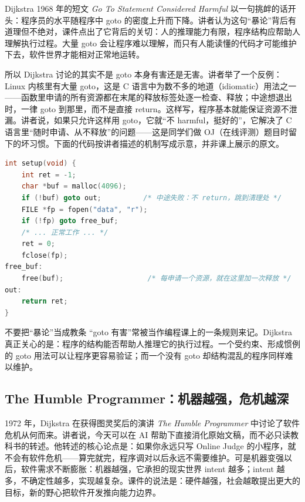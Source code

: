 \documentclass[a4paper]{article}
\begin{document}
Dijkstra 1968 年的短文 \emph{Go To Statement Considered Harmful} 以一句挑衅的话开头：程序员的水平随程序中 goto 的密度上升而下降。讲者认为这句“暴论”背后有道理但不绝对，课件点出了它背后的关切：人的推理能力有限，程序结构应帮助人理解执行过程。大量 goto 会让程序难以理解，而只有人能读懂的代码才可能维护下去，软件世界才能相对正常地运转。

所以 Dijkstra 讨论的其实不是 goto 本身有害还是无害。讲者举了一个反例：Linux 内核里有大量 goto，这是 C 语言中为数不多的地道（idiomatic）用法之一——函数里申请的所有资源都在末尾的释放标签处逐一检查、释放；中途想退出时，一律 goto 到那里，而不是直接 return。这样写，程序基本就能保证资源不泄漏。讲者说，如果只允许这样用 goto，它就“不 harmful，挺好的”，它解决了 C 语言里“随时申请、从不释放”的问题——这是同学们做 OJ（在线评测）题目时留下的坏习惯。下面的代码按讲者描述的机制写成示意，并非课上展示的原文。

\begin{lstlisting}[language=C,caption={讲者描述的 C 语言 goto 清理惯用法（本讲义按描述整理的示意）}]
int setup(void) {
    int ret = -1;
    char *buf = malloc(4096);
    if (!buf) goto out;          /* 中途失败：不 return，跳到清理处 */
    FILE *fp = fopen("data", "r");
    if (!fp) goto free_buf;
    /* ... 正常工作 ... */
    ret = 0;
    fclose(fp);
free_buf:
    free(buf);                    /* 每申请一个资源，就在这里加一次释放 */
out:
    return ret;
}
\end{lstlisting}

\begin{warningbox}{不要把“暴论”当成教条}
“goto 有害”常被当作编程课上的一条规则来记。Dijkstra 真正关心的是：程序的结构能否帮助人推理它的执行过程。一个受约束、形成惯例的 goto 用法可以让程序更容易验证；而一个没有 goto 却结构混乱的程序同样难以维护。
\end{warningbox}

\subsection{The Humble Programmer：机器越强，危机越深}

1972 年，Dijkstra 在获得图灵奖后的演讲 \emph{The Humble Programmer} 中讨论了软件危机从何而来。讲者说，今天可以在 AI 帮助下直接消化原始文稿，而不必只读教科书的转述。他转述的核心论点是：如果你永远只写 Online Judge 的小程序，就不会有软件危机——算完就完，程序调对以后永远不需要维护。可是机器变强以后，软件需求不断膨胀：机器越强，它承担的现实世界 intent 越多；intent 越多，不确定性越多，实现越复杂。课件的说法是：硬件越强，社会越敢提出更大的目标，新的野心把软件开发推向能力边界。
\end{document}
